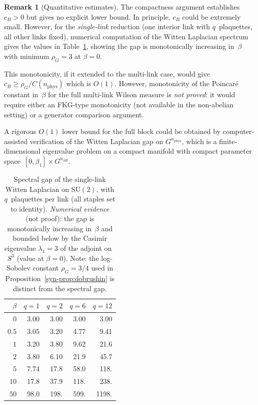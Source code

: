 \documentclass[11pt]{article}
\theoremstyle{definition}
\newtheorem{remark}[theorem]{Remark}
\newcommand{\SU}{\mathrm{SU}}
\begin{document}
\begin{remark}[Quantitative estimates]
\label{syn-rem:quantitative}
The compactness argument establishes $c_B > 0$ but gives
no explicit lower bound.  In principle, $c_B$ could be
extremely small.  However, for the \emph{single-link}
reduction (one interior link with $q$~plaquettes, all
other links fixed), numerical computation of the Witten
Laplacian spectrum gives the values in Table~\ref{syn-tab:monotone},
showing the gap is monotonically increasing in~$\beta$
with minimum $\rho_G = 3$ at $\beta = 0$.

This monotonicity, if it extended to the multi-link case,
would give $c_B \geq \rho_G / C(n_{\mathrm{phys}})$
which is $O(1)$.  However, monotonicity of the Poincar\'e
constant in~$\beta$ for the full multi-link Wilson measure
is \emph{not proved}: it would require either an FKG-type
monotonicity (not available in the non-abelian setting)
or a generator comparison argument.

A rigorous $O(1)$ lower bound for the full block could be
obtained by computer-assisted verification of the Witten
Laplacian gap on $G^{n_{\mathrm{phys}}}$, which is a
finite-dimensional eigenvalue problem on a compact manifold
with compact parameter space~$[0, \beta_1] \times
G^{n_{\partial B}}$.
\end{remark}

\begin{table}[t]
\caption{Spectral gap of the single-link Witten Laplacian on
$\SU(2)$, with $q$~plaquettes per link (all staples set to
identity).  \emph{Numerical evidence} (not proof):
the gap is monotonically increasing in~$\beta$
and bounded below by the Casimir eigenvalue $\lambda_1 = 3$
of the adjoint on~$S^3$ (value at $\beta = 0$).
Note: the log-Sobolev constant $\rho_G = 3/4$
used in Proposition~\ref{syn-prop:dobrushin} is distinct
from the spectral gap.}
\label{syn-tab:monotone}
\centering
\begin{tabular}{@{}r|rrrr@{}}
\toprule
$\beta$ & $q = 1$ & $q = 2$ & $q = 6$ & $q = 12$ \\ \midrule
$0$ & 3.00 & 3.00 & 3.00 & 3.00 \\
$0.5$ & 3.05 & 3.20 & 4.77 & 9.41 \\
$1$ & 3.20 & 3.80 & 9.62 & 21.6 \\
$2$ & 3.80 & 6.10 & 21.9 & 45.7 \\
$5$ & 7.74 & 17.8 & 58.0 & 118. \\
$10$ & 17.8 & 37.9 & 118. & 238. \\
$50$ & 98.0 & 198. & 599. & 1198. \\
\bottomrule
\end{tabular}
\end{table}
\end{document}
